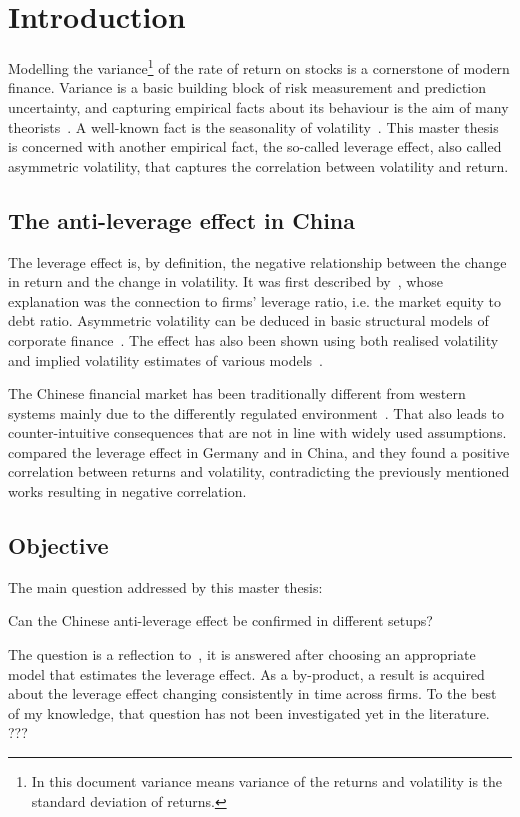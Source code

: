 \section{Introduction}

Modelling the variance\footnote{In this document variance means variance of the returns and volatility is the standard deviation of returns.} of the rate of return on stocks is a cornerstone of modern finance.
Variance is a basic building block of risk measurement and prediction uncertainty, and capturing empirical facts about its behaviour is the aim of many theorists~\citep{Christie1982}.
A well-known fact is the seasonality of volatility~\citep{schwert1989why}.
This master thesis is concerned with another empirical fact, the so-called leverage effect, also called asymmetric volatility, that captures the correlation between volatility and return.

\subsection{The anti-leverage effect in China}

The leverage effect is, by definition, the negative relationship between the change in return and the change in volatility.
It was first described by~\citet{black1976studies}, whose explanation was the connection to firms' leverage ratio, i.e. the market equity to debt ratio.
Asymmetric volatility can be deduced in basic structural models of corporate finance~\citep{Christie1982}.
The effect has also been shown using both realised volatility and implied volatility estimates of various models~\citep{Bouchaud2001,Harvey1996,Christie1982,french1987expected}.

The Chinese financial market has been traditionally different from western systems mainly due to the differently regulated environment~\citep{GORDON2003}.
That also leads to counter-intuitive consequences that are not in line with widely used assumptions.
\citet{Shen2009} compared the leverage effect in Germany and in China, and they found a positive correlation between returns and volatility, contradicting the previously mentioned works resulting in negative correlation.


\subsection{Objective}

The main question addressed by this master thesis:
\begin{center}
	Can the Chinese anti-leverage effect be confirmed in different setups?
\end{center}
The question is a reflection to~\citet{Shen2009}, it is answered after choosing an appropriate model that estimates the leverage effect.
As a by-product, a result is acquired about the leverage effect changing consistently in time across firms.
To the best of my knowledge, that question has not been investigated yet in the literature. ???

